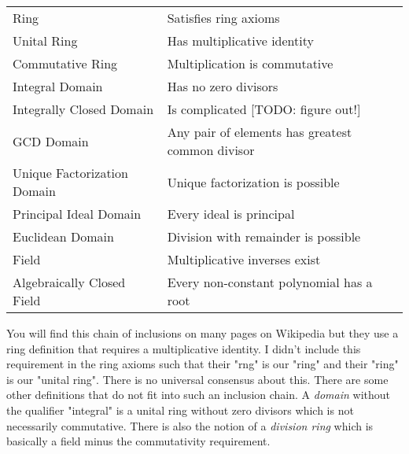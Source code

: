\medskip
\begin{tabular}{l l}
Ring                        & Satisfies ring axioms \\
Unital Ring                 & Has multiplicative identity \\
Commutative Ring            & Multiplication is commutative \\
Integral Domain             & Has no zero divisors \\
Integrally Closed Domain    & Is complicated [TODO: figure out!] \\
GCD Domain                  & Any pair of elements has greatest common divisor \\
Unique Factorization Domain & Unique factorization is possible \\
Principal Ideal Domain      & Every ideal is principal \\
Euclidean Domain            & Division with remainder is possible \\
Field                       & Multiplicative inverses exist \\
Algebraically Closed Field  & Every non-constant polynomial has a root
\end{tabular}
\medskip

You will find this chain of inclusions on many pages on Wikipedia but they use a ring definition that requires a multiplicative identity. I didn't include this requirement in the ring axioms such that their "rng" is our "ring" and their "ring" is our "unital ring". There is no universal consensus about this. There are some other definitions that do not fit into such an inclusion chain. A \emph{domain} without the qualifier "integral" is a unital ring without zero divisors which is not necessarily commutative. There is also the notion of a \emph{division ring} which is basically a field minus the commutativity requirement.

%
%



% 

